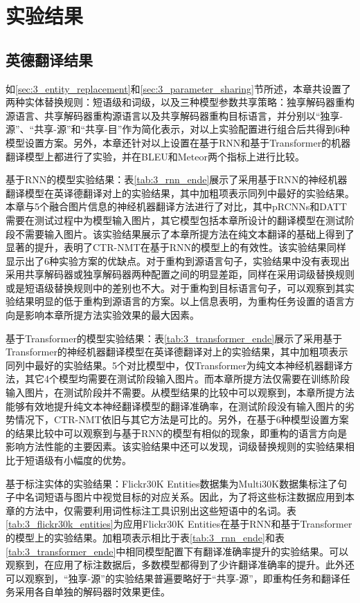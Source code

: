 \section{实验结果}

\subsection{英德翻译结果}

如\ref{sec:3_entity_replacement}和\ref{sec:3_parameter_sharing}节所述，本章共设置了两种实体替换规则：短语级和词级，以及三种模型参数共享策略：独享解码器重构源语言、共享解码器重构源语言以及共享解码器重构目标语言，并分别以“独享-源”、“共享-源”和“共享-目”作为简化表示，对以上实验配置进行组合后共得到6种模型设置方案。另外，本章还针对以上设置在基于RNN和基于Transformer的机器翻译模型上都进行了实验，并在BLEU和Meteor两个指标上进行比较。

{\sffamily 基于RNN的模型实验结果：}表\ref{tab:3_rnn_ende}展示了采用基于RNN的神经机器翻译模型在英译德翻译对上的实验结果，其中加粗项表示同列中最好的实验结果。本章与5个融合图片信息的神经机器翻译方法进行了对比，其中pRCNNs和DATT需要在测试过程中为模型输入图片，其它模型包括本章所设计的翻译模型在测试阶段不需要输入图片。该实验结果展示了本章所提方法在纯文本翻译的基础上得到了显著的提升，表明了CTR-NMT在基于RNN的模型上的有效性。该实验结果同样显示出了6种实验方案的优缺点。对于重构到源语言句子，实验结果中没有表现出采用共享解码器或独享解码器两种配置之间的明显差距，同样在采用词级替换规则或是短语级替换规则中的差别也不大。对于重构到目标语言句子，可以观察到其实验结果明显的低于重构到源语言的方案。以上信息表明，为重构任务设置的语言方向是影响本章所提方法实验效果的最大因素。


{\sffamily 基于Transformer的模型实验结果：}表\ref{tab:3_transformer_ende}展示了采用基于Transformer的神经机器翻译模型在英译德翻译对上的实验结果，其中加粗项表示同列中最好的实验结果。5个对比模型中，仅Transformer为纯文本神经机器翻译方法，其它4个模型均需要在测试阶段输入图片。而本章所提方法仅需要在训练阶段输入图片，在测试阶段并不需要。从模型结果的比较中可以观察到，本章所提方法能够有效地提升纯文本神经翻译模型的翻译准确率，在测试阶段没有输入图片的劣势情况下，CTR-NMT依旧与其它方法是可比的。另外，在基于6种模型设置方案的结果比较中可以观察到与基于RNN的模型有相似的现象，即重构的语言方向是影响方法性能的主要因素。该实验结果中还可以发现，词级替换规则的实验结果相比于短语级有小幅度的优势。


{\sffamily 基于标注实体的实验结果：}Flickr30K Entities数据集为Multi30K数据集标注了句子中名词短语与图片中视觉目标的对应关系。因此，为了将这些标注数据应用到本章的方法中，仅需要利用词性标注工具识别出这些短语中的名词。表\ref{tab:3_flickr30k_entities}为应用Flickr30K Entities在基于RNN和基于Transformer的模型上的实验结果。加粗项表示相比于表\ref{tab:3_rnn_ende}和表\ref{tab:3_transformer_ende}中相同模型配置下有翻译准确率提升的实验结果。可以观察到，在应用了标注数据后，多数模型都得到了少许翻译准确率的提升。此外还可以观察到，“独享-源”的实验结果普遍要略好于“共享-源”，即重构任务和翻译任务采用各自单独的解码器时效果更佳。

